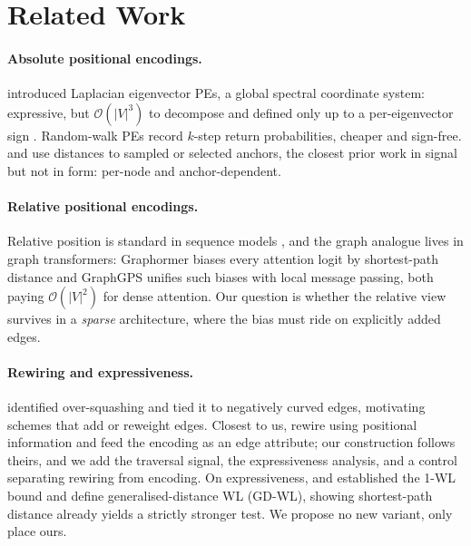 \documentclass[11pt]{article}
\begin{document}
\section{Related Work}

\paragraph{Absolute positional encodings.}
\citet{dwivedi2023benchmarking} introduced Laplacian eigenvector PEs, a global spectral
coordinate system: expressive, but $\mathcal{O}(|V|^3)$ to decompose and defined only up to a
per-eigenvector sign \citep{lim2023signnet}. Random-walk PEs \citep{dwivedi2022lspe} record
$k$-step return probabilities, cheaper and sign-free. \citet{you2019pgnn} and
\citet{li2020distance} use distances to sampled or selected anchors, the closest prior work in
signal but not in form: per-node and anchor-dependent.

\paragraph{Relative positional encodings.}
Relative position is standard in sequence models \citep{vaswani2017attention}, and the graph
analogue lives in graph transformers: Graphormer
\citep{ying2021graphormer} biases every attention logit by shortest-path distance and GraphGPS
\citep{rampasek2022gps} unifies such biases with local message passing, both paying
$\mathcal{O}(|V|^2)$ for dense attention. Our question is whether the relative view survives in
a \emph{sparse} architecture, where the bias must ride on explicitly added edges.

\paragraph{Rewiring and expressiveness.}
\citet{alon2021bottleneck} identified over-squashing and \citet{topping2022curvature} tied it to
negatively curved edges, motivating schemes that add or reweight edges. Closest to us,
\citet{bruel2022rewiring} rewire using positional information and feed the encoding as an edge
attribute; our construction follows theirs, and we add the traversal signal, the expressiveness
analysis, and a control separating rewiring from encoding. On expressiveness,
\citet{xu2019gin} and \citet{morris2019wlgo} established the 1-WL bound and
\citet{zhang2023biconnectivity} define generalised-distance WL (GD-WL), showing shortest-path
distance already yields a strictly stronger test. We propose no new variant, only place ours.
\end{document}
